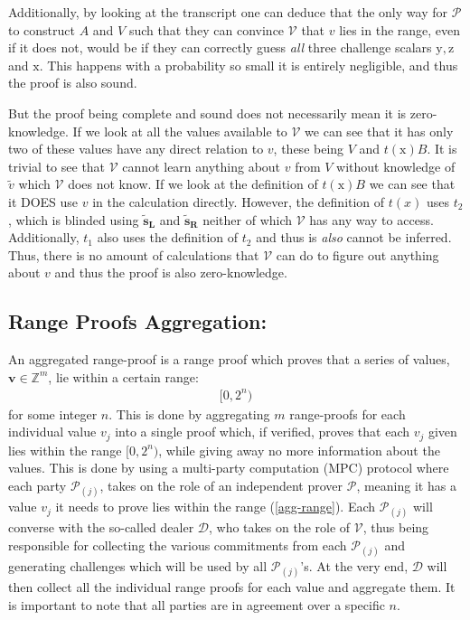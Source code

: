 \documentclass{article}
\newcommand{\eqn}[2]{\begin{equation}\label{#1}\begin{split}#2\end{split}\end{equation}}
\renewcommand{\vec}[1]{\boldsymbol{#1}}
\newcommand{\ran}[1]{\mathrm{#1}}
\newcommand{\V}{\mathcal{V}}
\renewcommand{\P}{\mathcal{P}}
\newcommand{\D}{\mathcal{D}}
\newcommand{\Z}{\mathbb{Z}}
\newcommand{\opn}[1]{\operatorname{#1}}
\newcommand{\vecl}[1]{\vec{#1_{\opn{L}}}}
\newcommand{\vecr}[1]{\vec{#1_{\opn{R}}}}
\newcommand{\blind}[1]{\widetilde{#1}}
\newcommand{\bv}{\blind{v}}
\newcommand{\bs}{\blind{s}}
\begin{document}
Additionally, by looking at the transcript one can deduce that the only
way for $\P$ to construct $A$ and $V$ such that they can convince $\V$
that $v$ lies in the range, even if it does not, would be if they
can correctly guess \textit{all} three challenge scalars $\ran{y},
\ran{z}$ and $\ran{x}$. This happens with a probability so small it
is entirely negligible, and thus the proof is also sound.

But the proof being complete and sound does not necessarily mean it is
zero-knowledge. If we look at all the values available to $\V$ we can 
see that it has only two of these values have any direct relation to 
$v$, these being $V$ and $t(\ran{x})B$. It is trivial to see that $\V$ 
cannot learn anything about $v$ from $V$ without knowledge of $\bv$ 
which $\V$ does not know. If we look at the definition of $t(\ran{x})B$ 
we can see that it DOES use $v$ in the calculation directly. However,
the definition of $t(x)$ uses $t_2$, which is blinded using
$\vecl{\bs}$ and $\vecr{\bs}$ neither of which $\V$ has any way
to access. Additionally, $t_1$ also uses the definition of $t_2$ and
thus is \textit{also} cannot be inferred. Thus, there is no amount
of calculations that $\V$ can do to figure out anything about $v$
and thus the proof is also zero-knowledge.

\subsection{Range Proofs Aggregation:} \label{range-proof-aggregation}

An aggregated range-proof is a range proof which proves that a series
of values, $\vec{v} \in \Z^m$, lie within a certain range:
\eqn{agg-range}{
	[0,2^n)
}
for some integer $n$. This is done by aggregating $m$ range-proofs for
each individual value $v_j$ into a single proof which, if verified,
proves that each $v_j$ given lies within the range $[0,2^n)$, while
giving away no more information about the values. This is done by using
a multi-party computation (MPC) protocol where each party $\P_{(j)}$,
takes on the role of an independent prover $\P$, meaning it has a value
$v_j$ it needs to prove lies within the range (\ref{agg-range}). Each
$\P_{(j)}$ will converse with the so-called dealer $\D$, who takes on
the role of $\V$, thus being responsible for collecting the various
commitments from each $\P_{(j)}$ and generating challenges which will
be used by all $\P_{(j)}$'s. At the very end, $\D$ will then collect
all the individual range proofs for each value and aggregate them. It is
important to note that all parties are in agreement over a specific $n$.
\end{document}
